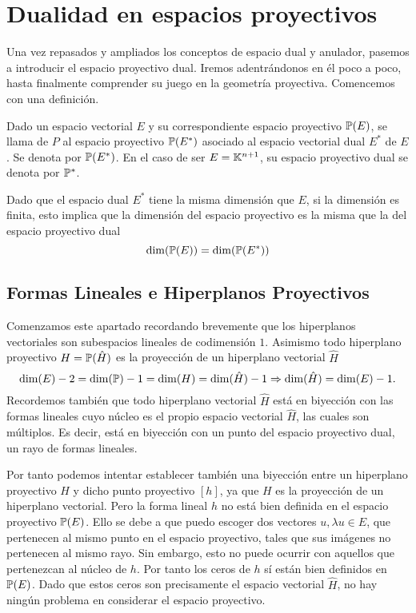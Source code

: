 \section{Dualidad en espacios proyectivos}
Una vez repasados y ampliados los conceptos de espacio dual y anulador, pasemos a introducir el espacio proyectivo dual. Iremos adentrándonos en él poco a poco, hasta finalmente comprender su juego en la geometría proyectiva. Comencemos con una definición.
\begin{defi}
	Dado un espacio vectorial $E$ y su correspondiente espacio proyectivo $\mathbb{P}(E)$, se llama  de $P$ al espacio proyectivo $\mathbb{P}(E^*)$ asociado al espacio vectorial dual $E^*$ de $E$. Se denota por $\mathbb{P}(E^*)$. En el caso de ser $E=\mathbb{K}^{n+1}$, su espacio proyectivo dual se denota por $\mathbb{P}^*$.
\end{defi}
\begin{obs}
	Dado que el espacio dual $E^*$ tiene la misma dimensión que $E$, si la dimensión es finita, esto implica que la dimensión del espacio proyectivo es la misma que la del espacio proyectivo dual
	\begin{equation*}
	\dim(\mathbb{P}(E))=\dim (\mathbb{P}(E^*))
	\end{equation*}
\end{obs}

\subsection{Formas Lineales e Hiperplanos Proyectivos}

Comenzamos este apartado recordando brevemente que los hiperplanos vectoriales son subespacios lineales de codimensión $1$. Asimismo todo hiperplano proyectivo $H=\mathbb{P}(\hat{H})$ es la proyección de un hiperplano vectorial $\hat{H}$
\begin{equation}
\dim(E)-2=\dim(\mathbb{P})-1=\dim(H)=\dim(\hat{H})-1\Rightarrow \dim(\hat{H})=\dim(E)-1.
\end{equation}
Recordemos también que todo hiperplano vectorial $\hat{H}$ está en biyección con las formas lineales cuyo núcleo es el propio espacio vectorial $\hat{H}$, las cuales son múltiplos. Es decir, está en biyección con un punto del espacio proyectivo dual, un rayo de formas lineales.

Por tanto podemos intentar establecer también una biyección entre un hiperplano proyectivo $H$ y dicho punto proyectivo $[h]$, ya que $H$ es la proyección de un hiperplano vectorial. Pero la forma lineal $h$ no está bien definida en el espacio proyectivo $\mathbb{P}(E)$. Ello se debe a que puedo escoger dos vectores  $u, \lambda u\in E$, que pertenecen al mismo punto en el espacio proyectivo, tales que sus imágenes no pertenecen al mismo rayo. Sin embargo, esto no puede ocurrir con aquellos que pertenezcan al núcleo de $h$. Por tanto los ceros de $h$ sí están bien definidos en $\mathbb{P}(E)$. Dado que estos ceros son precisamente el espacio vectorial $\hat{H}$, no hay ningún problema en considerar el espacio proyectivo.

